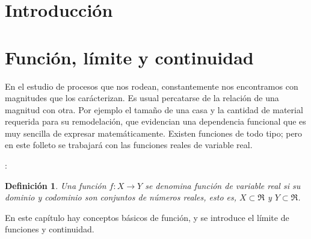 \documentclass[10pt,twoside]{SelfArx} %
\begin{document}


\section*{Introducci\'on}





\section{Funci\'on, l\'imite y continuidad}

En el estudio de procesos que nos rodean, constantemente nos encontramos con magnitudes que los carácterizan. Es usual percatarse de la relación de una magnitud con otra. Por ejemplo el tamaño de una casa y la cantidad de material requerida para su remodelación, que evidencian una dependencia funcional que es muy sencilla de expresar matemáticamente. Existen funciones de todo tipo; pero en este folleto se trabajará con las funciones reales de variable real.\\


\newtheorem{thm}{Definici\'on}:
\begin{thm}\label{func_real}
	Una funci\'on $ f:X\rightarrow Y $ se denomina \textit{función de variable real } si su dominio y codominio son conjuntos de números reales, esto es, $ X\subset\Re $ y $ Y\subset\Re $.
\end{thm}


En este capítulo hay conceptos básicos de función, y se introduce el  límite de funciones y continuidad.
\end{document}
